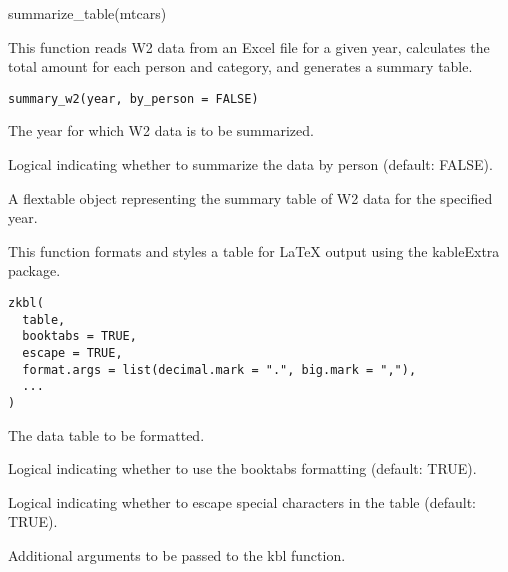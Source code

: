 \documentclass[a4paper]{book}
\begin{document}
%
\begin{Examples}
\begin{ExampleCode}
summarize_table(mtcars)

\end{ExampleCode}
\end{Examples}
%
\begin{Description}
This function reads W2 data from an Excel file for a given year, calculates
the total amount for each person and category, and generates a summary table.
\end{Description}
%
\begin{Usage}
\begin{verbatim}
summary_w2(year, by_person = FALSE)
\end{verbatim}
\end{Usage}
%
\begin{Arguments}
\begin{ldescription}
\item[\code{year}] The year for which W2 data is to be summarized.

\item[\code{by\_person}] Logical indicating whether to summarize the data by person (default: FALSE).
\end{ldescription}
\end{Arguments}
%
\begin{Value}
A flextable object representing the summary table of W2 data for the specified year.
\end{Value}
%
\begin{Description}
This function formats and styles a table for LaTeX output using the kableExtra package.
\end{Description}
%
\begin{Usage}
\begin{verbatim}
zkbl(
  table,
  booktabs = TRUE,
  escape = TRUE,
  format.args = list(decimal.mark = ".", big.mark = ","),
  ...
)
\end{verbatim}
\end{Usage}
%
\begin{Arguments}
\begin{ldescription}
\item[\code{table}] The data table to be formatted.

\item[\code{booktabs}] Logical indicating whether to use the booktabs formatting (default: TRUE).

\item[\code{escape}] Logical indicating whether to escape special characters in the table (default: TRUE).

\item[\code{...}] Additional arguments to be passed to the kbl function.
\end{ldescription}
\end{Arguments}
\end{document}
